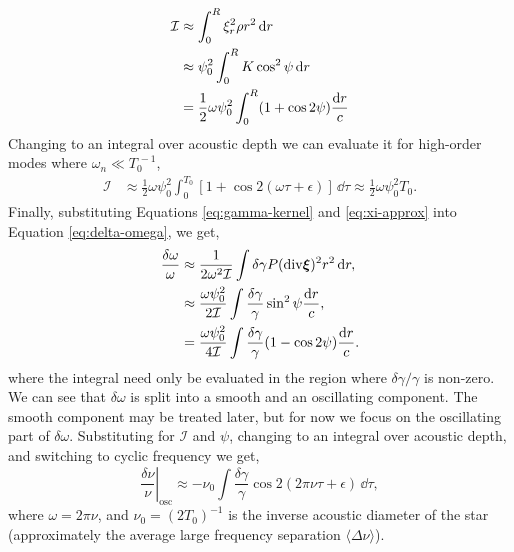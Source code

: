 \begin{align}
    \mathcal{I} &\approx \int_0^R \xi_r^2 \rho r^2 \, \mathrm{d} r \notag\\
    &\approx \psi_0^2 \int_0^R K \cos^2\psi \, \mathrm{d} r \notag \\
    &= \frac12 \omega \psi_0^2 \int_0^R (1 + \cos 2 \psi) \frac{\mathrm{d} r}{c}
\end{align}
%
Changing to an integral over acoustic depth we can evaluate it for high-order modes where \(\omega_n \ll T_0^{\,-1}\),
%
\begin{align}
    \mathcal{I} &\approx \frac12 \omega \psi_0^2 \int_0^{T_0} [1 + \cos 2 (\omega\tau + \epsilon)] \, \dd \tau \approx \frac12 \omega \psi_0^2 T_0.
\end{align}
%
Finally, substituting Equations \ref{eq:gamma-kernel} and \ref{eq:xi-approx} into Equation \ref{eq:delta-omega}, we get,
%
\begin{align}
    \frac{\delta\omega}{\omega} &\approx \frac{1}{2\omega^2\mathcal{I}} \int \delta\gamma P (\mathrm{div} \bm{\xi})^2 r^2 \, \mathrm{d} r, \notag \\
    &\approx \frac{\omega \psi_0^2}{2 \mathcal{I}} \int \frac{\delta\gamma}{\gamma}\sin^2\psi\frac{\mathrm{d} r}{c}, \notag \\
    &= \frac{\omega \psi_0^2}{4 \mathcal{I}} \int \frac{\delta\gamma}{\gamma}(1 - \cos 2\psi)\frac{\mathrm{d} r}{c}.
\end{align}
%
where the integral need only be evaluated in the region where \(\delta\gamma / \gamma\) is non-zero. We can see that \(\delta\omega\) is split into a smooth and an oscillating component. The smooth component may be treated later, but for now we focus on the oscillating part of \(\delta\omega\). Substituting for \(\mathcal{I}\) and \(\psi\), changing to an integral over acoustic depth, and switching to cyclic frequency we get,
%
\begin{equation}
    \left.\frac{\delta\nu}{\nu}\right|_\mathrm{osc} \approx - \nu_0 \int \frac{\delta\gamma}{\gamma} \cos 2 (2 \pi\nu\tau + \epsilon) \, \dd \tau,
\end{equation}
%
where \(\omega = 2\pi\nu\), and \(\nu_0 = (2 T_0)^{-1}\) is the inverse acoustic diameter of the star (approximately the average large frequency separation \(\langle \Delta \nu \rangle\)).

